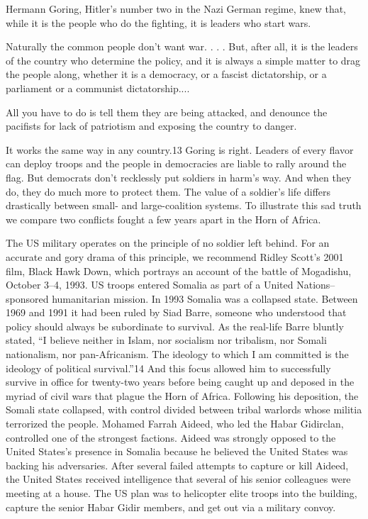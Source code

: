 \documentclass[10pt]{article}
\begin{document}
{\large Hermann Goring, Hitler's number two in the Nazi German regime, knew
that, while it is the people who do the fighting, it is leaders who start wars.}

{\large Naturally the common people don't want war. . . . But, after all, it is
the leaders of the country who determine the policy, and it is always a simple
matter to drag the people along, whether it is a democracy, or a fascist
dictatorship, or a parliament or a communist dictatorship....}

{\large All you have to do is tell them they are being attacked, and denounce
the pacifists for lack of patriotism and exposing the country to danger.}

{\large It works the same way in any country.13 Goring is right. Leaders of
every flavor can deploy troops and the people in democracies are liable to rally
around the flag. But democrats don't recklessly put soldiers in harm's way. And
when they do, they do much more to protect them. The value of a soldier's life
differs drastically between small- and large-coalition systems. To illustrate
this sad truth we compare two conflicts fought a few years apart in the Horn of
Africa.}

{\large The US military operates on the principle of no soldier left behind. For
an accurate and gory drama of this principle, we recommend Ridley Scott's 2001
film, Black Hawk Down, which portrays an account of the battle of Mogadishu,
October 3--4, 1993. US troops entered Somalia as part of a United
Nations--sponsored humanitarian mission. In 1993 Somalia was a collapsed state.
Between 1969 and 1991 it had been ruled by Siad Barre, someone who understood
that policy should always be subordinate to survival. As the real-life Barre
bluntly stated, ``I believe neither in Islam, nor socialism nor tribalism, nor
Somali nationalism, nor pan-Africanism. The ideology to which I am committed is
the ideology of political survival.''14 And this focus allowed him to
successfully survive in office for twenty-two years before being caught up and
deposed in the myriad of civil wars that plague the Horn of Africa. Following his
deposition, the Somali state collapsed, with control divided between tribal
warlords whose militia terrorized the people. Mohamed Farrah Aideed, who led the
Habar Gidirclan, controlled one of the strongest factions. Aideed was strongly
opposed to the United States's presence in Somalia because he believed the United
States was backing his adversaries. After several failed attempts to capture or
kill Aideed, the United States received intelligence that several of his senior
colleagues were meeting at a house. The US plan was to helicopter elite troops
into the building, capture the senior Habar Gidir members, and get out via a
military convoy.}
\end{document}
